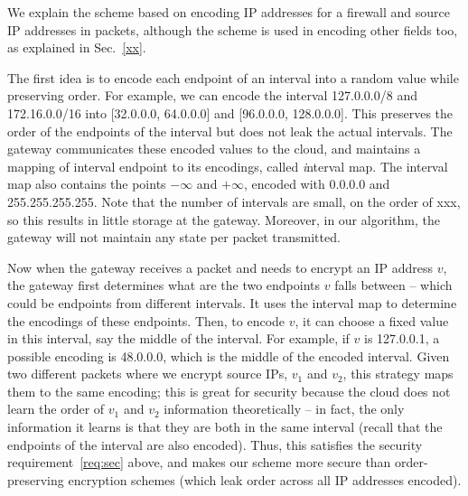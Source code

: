 We explain the scheme based on encoding IP addresses for a firewall and source IP addresses in packets, although the scheme is used in encoding other fields too, as explained in Sec.~\ref{xx}.

The first idea is to encode each endpoint of an interval into a random value while preserving order. For example, we can encode the interval 127.0.0.0/8 and 172.16.0.0/16 into [32.0.0.0, 64.0.0.0] and [96.0.0.0, 128.0.0.0]. This preserves the order of the endpoints of the interval but does not leak the actual intervals. 
The gateway communicates these encoded values to the cloud, and maintains a mapping of interval endpoint  to its encodings, called {\emph interval map}.  The interval map also contains the points $- \infty$ and $+ \infty$, encoded with 0.0.0.0 and 255.255.255.255. 
Note that the number of intervals are small, on the order of xxx, so this results in little storage at the gateway. Moreover, in our algorithm, the gateway will not maintain any state per packet transmitted.

Now when the gateway receives a packet and needs to encrypt an IP address $v$, the gateway first determines what are the two endpoints $v$ falls between -- which could be  endpoints from different intervals. It uses the interval map to determine the encodings of these endpoints. Then, to encode $v$, it can choose a fixed value in this interval, say the middle of the interval. 
For example, if $v$ is 127.0.0.1, a possible encoding is 48.0.0.0, which is the middle of the encoded interval. Given two different packets where we encrypt source IPs, $v_1$ and $v_2$, this strategy maps them to the same encoding; this is great for security because the cloud does not learn the order of $v_1$ and $v_2$ information theoretically -- in fact, the only information it learns is that they are both in the same interval (recall that the endpoints of the interval are also encoded). Thus, this satisfies the security requirement~\ref{req:sec} above, and makes our scheme more secure than order-preserving encryption schemes (which leak order across all IP addresses encoded).

